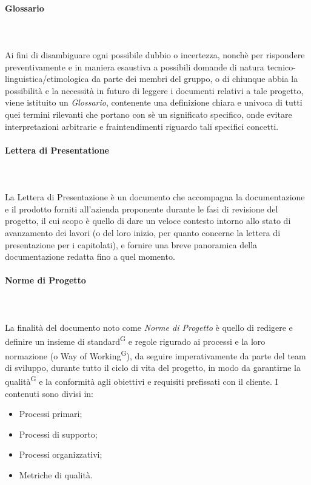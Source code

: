 \documentclass[8pt]{article}
\newcommand{\glossterm}[1]{#1\textsuperscript{G}} %
\newcommand{\subsubsubsection}[1]{\paragraph{#1}\mbox{}\\}
\begin{document}
\subsubsubsection{Glossario}\\
Ai fini di disambiguare ogni possibile dubbio o incertezza, nonchè per rispondere preventivamente e
in maniera esaustiva a possibili domande di natura tecnico-linguistica/etimologica da parte dei
membri del gruppo, o di chiunque abbia la possibilità e la necessità in futuro di leggere i
documenti relativi a tale progetto, viene istituito un \textit{Glossario}, contenente una definizione chiara e univoca di tutti quei termini rilevanti che portano con sè un significato specifico, onde evitare interpretazioni arbitrarie e fraintendimenti riguardo tali specifici concetti.

\subsubsubsection{Lettera di Presentatione}\\
La Lettera di Presentazione è un documento che accompagna la documentazione e il prodotto forniti all'azienda proponente durante le fasi di revisione del progetto, il cui scopo è quello di dare un veloce contesto intorno allo stato di avanzamento dei lavori (o del loro inizio, per quanto concerne la lettera di presentazione per i capitolati), e fornire una breve panoramica della documentazione redatta fino a quel momento. 

\subsubsubsection{Norme di Progetto}\\
La finalità del documento noto come \textit{Norme di Progetto }è quello di redigere e definire un insieme di \glossterm{standard} e regole rigurado ai processi e la loro normazione (o \glossterm{Way of Working}), da seguire imperativamente da parte del team di sviluppo, durante tutto il ciclo di vita del progetto, in modo da garantirne la \glossterm{qualità} e la conformità agli obiettivi e requisiti prefissati con il cliente. I contenuti sono divisi in:
\begin{itemize}
    \item Processi primari;
    \item Processi di supporto;
    \item Processi organizzativi;
    \item Metriche di qualità.
\end{itemize}
\end{document}
